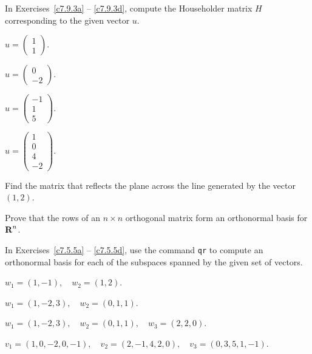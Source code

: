 \noindent In Exercises~\ref{c7.9.3a} -- \ref{c7.9.3d}, compute the
Householder matrix $H$ corresponding to the given vector $u$.
\begin{exercise} \label{c7.9.3a}
$u = \left(\begin{array}{r} 1\\ 1 \end{array}\right)$.
\end{exercise}
\begin{exercise} \label{c7.9.3b}
$u = \left(\begin{array}{r} 0\\ -2 \end{array}\right)$.
\end{exercise}
\begin{exercise} \label{c7.9.3c}
$u = \left(\begin{array}{r} -1\\ 1 \\5\end{array}\right)$.
\end{exercise}
\begin{exercise} \label{c7.9.3d}
$u = \left(\begin{array}{r} 1\\ 0 \\ 4\\ -2\end{array}\right)$.
\end{exercise}

\begin{exercise} \label{c7.9.4}
Find the matrix that reflects the plane across the line generated by the
vector $(1,2)$.
\end{exercise}

\begin{exercise}  \label{c7.9.45}
Prove that the rows of an $n\times n$ orthogonal matrix form an orthonormal
basis for $\mbox{$\bf{R}$}^n$.
\end{exercise}

\CEXER

In Exercises~\ref{c7.5.5a} -- \ref{c7.5.5d}, use the \Matlab command
{\tt qr} to compute an orthonormal basis for each of the subspaces spanned
by the given set of vectors.
\begin{exercise} \label{c7.5.5a}
$w_1=(1,-1),\quad w_2=(1,2)$.
\end{exercise}
\begin{exercise} \label{c7.5.5b}
$w_1=(1,-2,3),\quad w_2=(0,1,1)$.
\end{exercise}
\begin{exercise} \label{c7.5.5c}
$w_1=(1,-2,3),\quad w_2=(0,1,1),\quad w_3=(2,2,0)$.
\end{exercise}
\begin{exercise} \label{c7.5.5d}
$v_1=(1,0,-2,0,-1),\quad v_2=(2,-1,4,2,0),\quad v_3=(0,3,5,1,-1)$.
\end{exercise}


